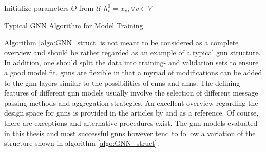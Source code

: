 	\begin{algorithm}[h]
		\scriptsize
		\SetAlgoLined
		\nl Initialize parameters $\Theta$ from $\mathcal{U}$\;
		\nl $h_{v}^{0} = x_{v},\forall v \in V$\\
		\nl {}
		\caption{Typical GNN Algorithm for Model Training}
		\label{algo:GNN_struct}
	\end{algorithm}

	\noindent Algorithm \ref{algo:GNN_struct} is not meant to be considered as
	a complete overview and should be rather regarded as an example of a typical 
	\acs{gnn} structure. In addition, one should split the data into training-
	and validation sets to ensure a good model fit. \acsp{gnn} are flexible in 
	that a myriad of modifications can be added to the \acs{gnn} layers similar 
	to the possibilities of \acsp{cnn} and \acsp{ann}. The defining features of
	different \acs{gnn} models usually involve the selection of different 
	message passing methods and aggregation strategies. An excellent overview 
	regarding the design space for \acsp{gnn} is provided in the articles by 
	\cite{you2020design} and \cite{zhou2020graph} as a reference. Of course, 
	there are exceptions and alternative procedures exist. The \acs{gnn}
	models evaluated in this thesis and most successful \acsp{gnn} however tend to 
	follow a variation of the structure shown in algorithm \ref{algo:GNN_struct}.  \\

